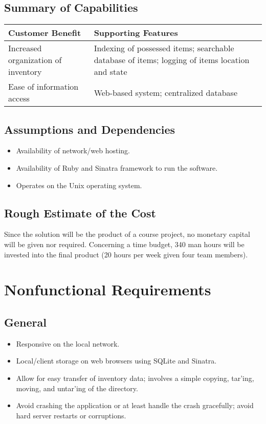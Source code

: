 \documentclass{article}
\begin{document}
\subsection{Summary of Capabilities}
\begin{tabular}{ | p{2.5in} | p{3.5in} | }
\hline
\textbf{Customer Benefit} & \textbf{Supporting Features}\\
\hline
\hline
Increased organization of inventory & Indexing of possessed items; searchable database of items; logging of items location and state\\
\hline
Ease of information access & Web-based system; centralized database\\
\hline
\end{tabular}

\subsection{Assumptions and Dependencies}
\begin{itemize}
\item Availability of network/web hosting.
\item Availability of Ruby and Sinatra framework to run the software.
\item Operates on the Unix operating system.
\end{itemize}

\subsection{Rough Estimate of the Cost}
Since the solution will be the product of a course project, no monetary capital will be given nor required.  Concerning a time budget, 340 man hours will be invested into the final product (20 hours per week given four team members).

\section{Nonfunctional Requirements}

\subsection{General}
\begin{itemize}
\item Responsive on the local network.
\item Local/client storage on web browsers using SQLite and Sinatra.
\item Allow for easy transfer of inventory data; involves a simple copying, tar'ing, moving, and untar'ing of the directory.
\item Avoid crashing the application or at least handle the crash gracefully; avoid hard server restarts or corruptions.
\end{itemize}
\end{document}
